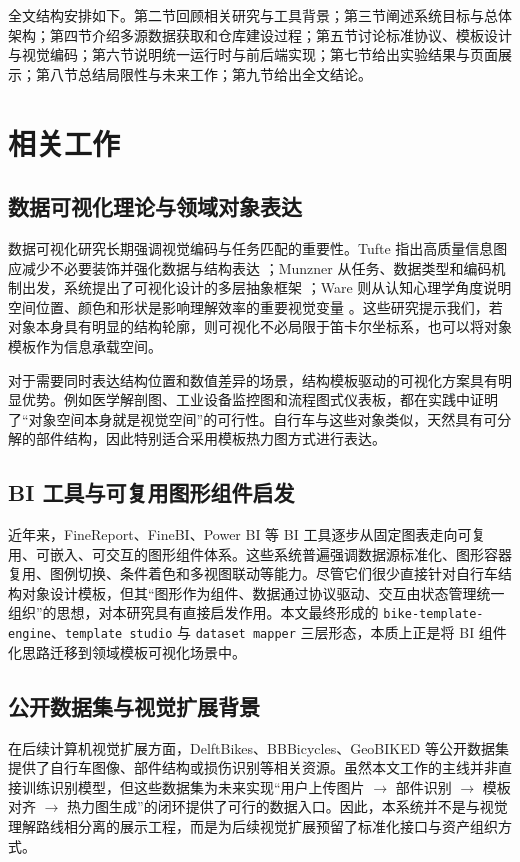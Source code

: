 \documentclass[12pt,hyperref,a4paper,UTF8]{ctexart}
\begin{document}
全文结构安排如下。第二节回顾相关研究与工具背景；第三节阐述系统目标与总体架构；第四节介绍多源数据获取和仓库建设过程；第五节讨论标准协议、模板设计与视觉编码；第六节说明统一运行时与前后端实现；第七节给出实验结果与页面展示；第八节总结局限性与未来工作；第九节给出全文结论。

\section{相关工作}

\subsection{数据可视化理论与领域对象表达}

数据可视化研究长期强调视觉编码与任务匹配的重要性。Tufte 指出高质量信息图应减少不必要装饰并强化数据与结构表达 \cite{Tufte2001}；Munzner 从任务、数据类型和编码机制出发，系统提出了可视化设计的多层抽象框架 \cite{Munzner2014}；Ware 则从认知心理学角度说明空间位置、颜色和形状是影响理解效率的重要视觉变量 \cite{Ware2020}。这些研究提示我们，若对象本身具有明显的结构轮廓，则可视化不必局限于笛卡尔坐标系，也可以将对象模板作为信息承载空间。

对于需要同时表达结构位置和数值差异的场景，结构模板驱动的可视化方案具有明显优势。例如医学解剖图、工业设备监控图和流程图式仪表板，都在实践中证明了“对象空间本身就是视觉空间”的可行性。自行车与这些对象类似，天然具有可分解的部件结构，因此特别适合采用模板热力图方式进行表达。

\subsection{BI 工具与可复用图形组件启发}

近年来，FineReport、FineBI、Power BI 等 BI 工具逐步从固定图表走向可复用、可嵌入、可交互的图形组件体系。这些系统普遍强调数据源标准化、图形容器复用、图例切换、条件着色和多视图联动等能力。尽管它们很少直接针对自行车结构对象设计模板，但其“图形作为组件、数据通过协议驱动、交互由状态管理统一组织”的思想，对本研究具有直接启发作用。本文最终形成的 \texttt{bike-template-engine}、\texttt{template studio} 与 \texttt{dataset mapper} 三层形态，本质上正是将 BI 组件化思路迁移到领域模板可视化场景中。

\subsection{公开数据集与视觉扩展背景}

在后续计算机视觉扩展方面，DelftBikes、BBBicycles、GeoBIKED 等公开数据集提供了自行车图像、部件结构或损伤识别等相关资源。虽然本文工作的主线并非直接训练识别模型，但这些数据集为未来实现“用户上传图片 $\rightarrow$ 部件识别 $\rightarrow$ 模板对齐 $\rightarrow$ 热力图生成”的闭环提供了可行的数据入口。因此，本系统并不是与视觉理解路线相分离的展示工程，而是为后续视觉扩展预留了标准化接口与资产组织方式。
\end{document}
